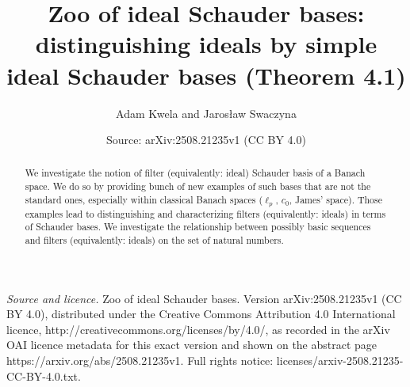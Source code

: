 \documentclass[10pt,a4paper]{amsart}
\title[Zoo of ideal Schauder bases]{Zoo of ideal Schauder bases: distinguishing ideals by simple ideal Schauder bases (Theorem 4.1)}
\author{Adam Kwela and Jaros{\l}aw Swaczyna}
\date{Source: arXiv:2508.21235v1 (CC BY 4.0)}
\begin{document}
\begin{abstract}
We investigate the notion of filter (equivalently: ideal) Schauder basis of a Banach space. We do so by providing bunch of new examples of such bases that are not the standard ones, especially within classical Banach spaces ($\ell_p$, $c_0$, James' space). Those examples lead to distinguishing and characterizing filters (equivalently: ideals) in terms of Schauder bases. We investigate the relationship between possibly basic sequences and filters (equivalently: ideals) on the set of natural numbers. 
\end{abstract}
\maketitle
\noindent\emph{Source and licence.} Zoo of ideal Schauder bases. Version arXiv:2508.21235v1 (CC BY 4.0), distributed under the Creative Commons Attribution 4.0 International licence, http://creativecommons.org/licenses/by/4.0/, as recorded in the arXiv OAI licence metadata for this exact version and shown on the abstract page https://arxiv.org/abs/2508.21235v1. Full rights notice: licenses/arxiv-2508.21235-CC-BY-4.0.txt.\par\smallskip
\end{document}
